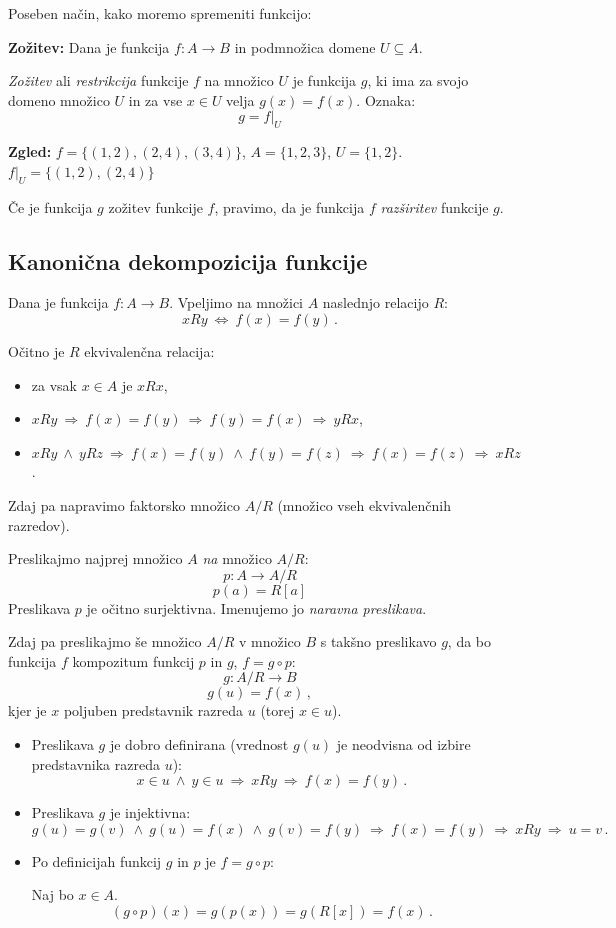 \documentclass[11pt,paper=b5,footinclude,headinclude]{scrbook} %
\def\inn {{~\wedge~}}
\def\sledi {{~\Rightarrow~}}
\def\cee {{~\Leftrightarrow~}}
\begin{document}
Poseben način, kako moremo spremeniti funkcijo:

\medskip
\textbf{ Zožitev:}
Dana je funkcija $f:A\to B$ in podmnožica domene $U\subseteq A$.

{\em Zožitev} ali {\em restrikcija} funkcije $f$ na množico $U$
je funkcija $g$, ki ima za svojo domeno množico $U$ in za vse $x\in U$ velja
$g(x) = f(x)$. Oznaka:
$$g = f|_{U}$$

\bigskip
\textbf{ Zgled:} $f = \{(1,2),(2,4),(3,4)\}$, $A = \{1,2,3\}$, $U =  \{1,2\}$.
$f|_U = \{(1,2),(2,4)\}$

\bigskip
Če je funkcija $g$ zožitev funkcije $f$, pravimo, da je funkcija $f$ {\em razširitev} funkcije $g$.

\subsection{Kanonična dekompozicija funkcije}

Dana je funkcija $f:A{\to} B$.
Vpeljimo na množici $A$ naslednjo relacijo $R$:
$$xRy \cee f(x) = f(y)\,.$$

Očitno je $R$ ekvivalenčna relacija:
\begin{itemize}
  \item za vsak $x\in A$ je $xRx$,
  \item $xRy \sledi f(x) = f(y) \sledi f(y) = f(x) \sledi yRx$,
  \item $xRy \inn yRz \sledi f(x) = f(y) \inn f(y) = f(z) \sledi f(x) = f(z) \sledi xRz$.
\end{itemize}
Zdaj pa napravimo faktorsko množico $A/R$ (množico vseh ekvivalenčnih razredov).

Preslikajmo najprej množico $A$ {\em na} množico  $A/R$:
$$p:A{\to} A/R$$
$$p(a) = R[a]$$
Preslikava $p$ je očitno surjektivna. Imenujemo jo {\em naravna preslikava}.

Zdaj pa preslikajmo še množico $A/R$ v množico $B$ s takšno preslikavo $g$, da bo
funkcija $f$ kompozitum funkcij $p$ in $g$, $f = g\circ p$:
$$g:A/R{\to} B$$
$$g(u) = f(x)\,,$$
kjer je $x$ poljuben predstavnik razreda $u$ (torej $x\in u$).

\begin{itemize}
  \item Preslikava $g$ je dobro definirana (vrednost $g(u)$ je neodvisna od izbire predstavnika razreda $u$):
$$x\in u\inn y\in u \sledi xRy \sledi f(x) = f(y)\,.$$
  \item Preslikava $g$ je injektivna:
$$g(u) = g(v) \inn g(u) = f(x) \inn g(v) = f(y) \sledi f(x) = f(y) \sledi xRy \sledi  u = v\,.$$
  \item Po definicijah funkcij $g$ in $p$ je $f = g\circ p$:

Naj bo $x\in A$.
$$(g\circ p)(x) = g(p(x)) = g(R[x]) = f(x)\,.$$
\end{itemize}
\end{document}
